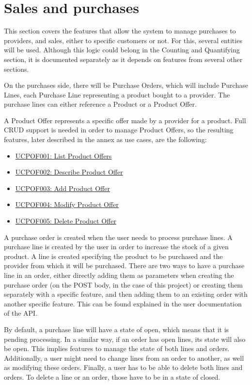 \section{Sales and purchases}
This section covers the features that allow the system to manage purchases to providers, and sales, either to specific customers or not. For this, several entities will be used. Although this logic could belong in the Counting and Quantifying section, it is documented separately as it depends on features from several other sections. 

On the purchases side, there will be Purchase Orders, which will include Purchase Lines, each Purchase Line representing a product bought to a provider. The purchase lines can either reference a Product or a Product Offer.

A Product Offer represents a specific offer made by a provider for a product. Full CRUD support is needed in order to manage Product Offers, so the resulting features, later described in the annex as use cases, are the following:
\hfill\break
\begin{itemize}
\item \hyperref[UCPOF001]{UCPOF001: List Product Offers}
\item \hyperref[UCPOF002]{UCPOF002: Describe Product Offer}
\item \hyperref[UCPOF003]{UCPOF003: Add Product Offer}
\item \hyperref[UCPOF004]{UCPOF004: Modify Product Offer}
\item \hyperref[UCPOF005]{UCPOF005: Delete Product Offer}
\end{itemize}
\hfill\break
A purchase order is created when the user needs to process purchase lines. A purchase line is created by the user in order to increase the stock of a given product. A line is created specifying the product to be purchased and the provider from which it will be purchased. There are two ways to have a purchase line in an order, either directly adding them as parameters when creating the purchase order (on the POST body, in the case of this project) or creating them separately with a specific feature, and then adding them to an existing order with another specific feature. This can be found explained in the user documentation of the API.

By default, a purchase line will have a state of open, which means that it is pending processing. In a similar way, if an order has open lines, its state will also be open. This implies features to manage the state of both lines and orders. Additionally, a user might need to change lines from an order to another, as well as modifying these orders. Finally, a user has to be able to delete both lines and orders. To delete a line or an order, those have to be in a state of closed.

